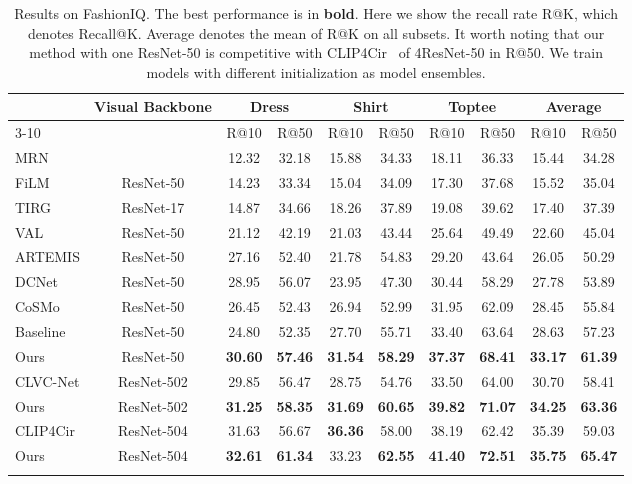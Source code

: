 \documentclass[10pt,twocolumn,letterpaper]{article}
\begin{document}
\begin{table*}[]
\centering
\small
    \begin{tabular}{l|c|cccccc|cc}
    \shline
    \multirow{2}{*}{Method} & \multirow{2}{*}{Visual Backbone} & \multicolumn{2}{c}{Dress} & \multicolumn{2}{c}{Shirt} & \multicolumn{2}{c}{Toptee} & \multicolumn{2}{|c}{Average}\\\cline{3-10}
    \multirow{2}{*}{} & \multirow{2}{*}{} &  R@10 & R@50 & R@10 & R@50 & R@10 & R@50 & R@10 & R@50\\\shline
    MRN \cite{MRN} & ResNet-152 & 12.32 & 32.18 & 15.88 & 34.33 & 18.11 & 36.33 & 15.44 & 34.28 \\
    FiLM \cite{perez2018film} & ResNet-50 & 14.23 & 33.34 & 15.04 & 34.09 & 17.30 & 37.68 & 15.52 & 35.04 \\
    TIRG \cite{TIRG} & ResNet-17 & 14.87 & 34.66 & 18.26 & 37.89 & 19.08 & 39.62 & 17.40 & 37.39 \\
    VAL \cite{Chen_2020_CVPR} & ResNet-50 & 21.12 & 42.19 & 21.03 & 43.44 & 25.64 & 49.49 & 22.60 & 45.04 \\
    ARTEMIS \cite{delmas2022artemis} & ResNet-50 & 27.16 & 52.40 & 21.78 & 54.83 & 29.20 & 43.64 & 26.05 & 50.29 \\
    DCNet \cite{kim:2021:AAAI} & ResNet-50 & 28.95 & 56.07 & 23.95 & 47.30 & 30.44 & 58.29 & 27.78 & 53.89 \\
    CoSMo \cite{2021CoSMo} & ResNet-50 & 26.45 & 52.43 & 26.94 & 52.99 & 31.95 & 62.09 & 28.45 & 55.84 \\
\hline 
    Baseline & ResNet-50 & 24.80 & 52.35 & 27.70 & 55.71 & 33.40 & 63.64 & 28.63 & 57.23\\
    Ours & ResNet-50 & \textbf{{30.60}} & \textbf{{57.46}} & \textbf{31.54} & \textbf{58.29} & \textbf{{37.37}} & \textbf{{68.41}} & \textbf{{33.17}} & \textbf{{61.39}}\\
    \shline
    CLVC-Net \cite{CLVC-Net} & ResNet-502 & 29.85 & 56.47 & 28.75 & 54.76 & 33.50 & 64.00 & 30.70 & 58.41 \\
    Ours & ResNet-502 & \textbf{{31.25}} & \textbf{{58.35}} & \textbf{{31.69}} & \textbf{{60.65}} & \textbf{{39.82}} & \textbf{{71.07}} & \textbf{{34.25}} & \textbf{{63.36}}\\ 
    \shline
    CLIP4Cir \cite{CLIP4Cir} & ResNet-504 & 31.63 & 56.67 & \textbf{{36.36}} & 58.00 & 38.19 & 62.42 & 35.39 & 59.03 \\
    Ours & ResNet-504 & \textbf{32.61} & \textbf{61.34} & 33.23 & \textbf{62.55} & \textbf{41.40} & \textbf{72.51} & \textbf{35.75} & \textbf{65.47}\\
    \shline
    \end{tabular}
    \vspace{-.1in}
    \caption{Results on FashionIQ. The best performance is in \textbf{bold}. Here we show the recall rate R@K, which denotes Recall@K. Average denotes the mean of R@K on all subsets. It worth noting that our method with one ResNet-50 is competitive with CLIP4Cir~\cite{CLIP4Cir} of 4ResNet-50 in R@50. We train models with different initialization as model ensembles.} 
    \label{tab:Recall rates on fashionIQ}
    \vspace{-.2in}
\end{table*}
\end{document}
